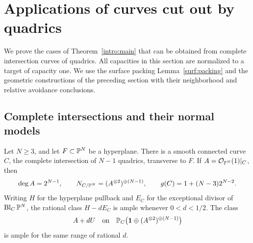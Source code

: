 \section{Applications of curves cut out by quadrics}
\label{app:applications}

We prove the cases of Theorem~\ref{intro:main} that can be obtained from
complete intersection curves of quadrics. All capacities in this section are
normalized to a target of capacity one. We use the surface packing
Lemma~\ref{surf:packing} and the geometric constructions of the preceding
section with their neighborhood and relative avoidance conclusions.

\subsection{Complete intersections and their normal models}

\begin{lemma}\label{app:quadrics}
Let $N\ge3$, and let $F\subset\mathbb P^N$ be a hyperplane. There is a smooth
connected curve $C$, the complete intersection of $N-1$ quadrics, transverse
to $F$. If $A=\mathcal O_{\mathbb P^N}(1)|_C$, then
\begin{equation}\label{app:quadric-data}
 \deg A=2^{N-1},\qquad
 N_{C/\mathbb P^N}=(A^{\otimes2})^{\oplus(N-1)},\qquad
 g(C)=1+(N-3)2^{N-2}.
\end{equation}
Writing $H$ for the hyperplane pullback and $E_C$ for the exceptional divisor
of $\operatorname{Bl}_C\mathbb P^N$, the rational class $H-dE_C$ is ample whenever
$0<d<1/2$. The class
\[
 A+dU\quad\hbox{on}\quad
 \mathbb P_C\bigl(\mathbf1\oplus (A^{\otimes2})^{\oplus(N-1)}\bigr)
\]
is ample for the same range of rational $d$.
\end{lemma}


